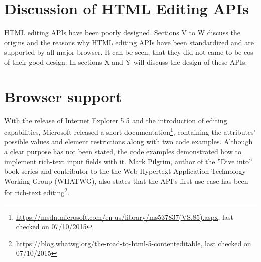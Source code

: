 \section{Discussion of HTML Editing APIs}

HTML editing APIs have been poorly designed. Sections V to W discuss the origins and the reasons why HTML editing APIs have been standardized and are supported by all major browser. It can be seen, that they did not came to be cos of their good design. In sections X and Y will discuss the design of these APIs.

\section{Browser support}

With the release of Internet Explorer 5.5 and the introduction of editing capabilities, Microsoft released a short documentation\footnote{\url{https://msdn.microsoft.com/en-us/library/ms537837(VS.85).aspx}, last checked on 07/10/2015}, containing the attributes' possible values and element restrictions along with two code examples. Although a clear purpose has not been stated, the code examples demonstrated how to implement rich-text input fields with it. Mark Pilgrim, author of the ''Dive into'' book series and contributor to the the Web Hypertext Application Technology Working Group (WHATWG), also states that the API's first use case has been for rich-text editing\footnote{\url{https://blog.whatwg.org/the-road-to-html-5-contenteditable}, last checked on 07/10/2015}. 



